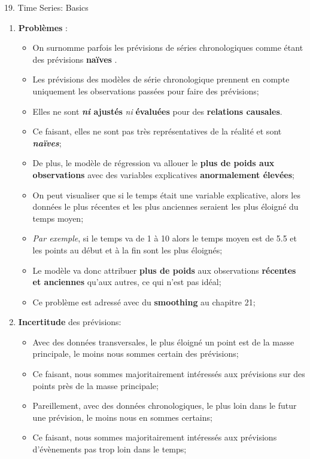 \documentclass[12pt, titlepage, french]{report}
\begin{document}
\begin{CHPT_SUMM}[label = {timeseries19}]{19. Time Series: Basics}
\begin{enumerate}
\begin{itemize}
		\texttt{[image: src/time-series-plots.png]}
		\end{itemize}
	\item[]	\textbf{Problèmes} :
		\begin{itemize}
		\item	On surnomme parfois les prévisions de séries chronologiques comme étant des prévisions \og \textbf{naïves} \fg{}. 
		\item[]	Les prévisions des modèles de série chronologique prennent en compte uniquement les observations passées pour faire des prévisions;
		\item[]	Elles ne sont \textbf{\textit{ni} ajustés} \textit{ni} \textbf{évaluées} pour des \textbf{relations causales}. 
		\item[]	Ce faisant, elles ne sont pas très représentatives de la réalité et sont \textbf{\textit{naïves}};
		\item	De plus, le modèle de régression va allouer le \textbf{plus de poids aux observations} avec des variables explicatives \textbf{anormalement élevées};
		\item[]	On peut visualiser que si le temps était une variable explicative, alors les données le plus récentes et les plus anciennes seraient les plus éloigné du temps moyen;
		\item[]	\textit{Par exemple}, si le temps va de 1 à 10 alors le temps moyen est de 5.5 et les points au début et à la fin sont les plus éloignés;
		\item[]	Le modèle va donc attribuer \textbf{plus de poids} aux observations \textbf{récentes et anciennes} qu'aux autres, ce qui n'est pas idéal;
		\item[]	Ce problème est adressé avec du \textbf{smoothing} au chapitre 21;		
		\end{itemize} 
	\item[]	\textbf{Incertitude} des prévisions:
		\begin{itemize}
		\item	Avec des données transversales, le plus éloigné un point est de la masse principale, le moins nous sommes certain des prévisions;
		\item[]	Ce faisant, nous sommes majoritairement intéressés aux prévisions sur des points près de la masse principale;
		\item 	Pareillement, avec des données chronologiques, le plus loin dans le futur une prévision, le moins nous en sommes certains;
		\item[]	Ce faisant, nous sommes majoritairement intéressés aux prévisions d'évènements pas trop loin dans le temps; 

\end{itemize}
\end{enumerate}
\end{CHPT_SUMM}
\end{document}
